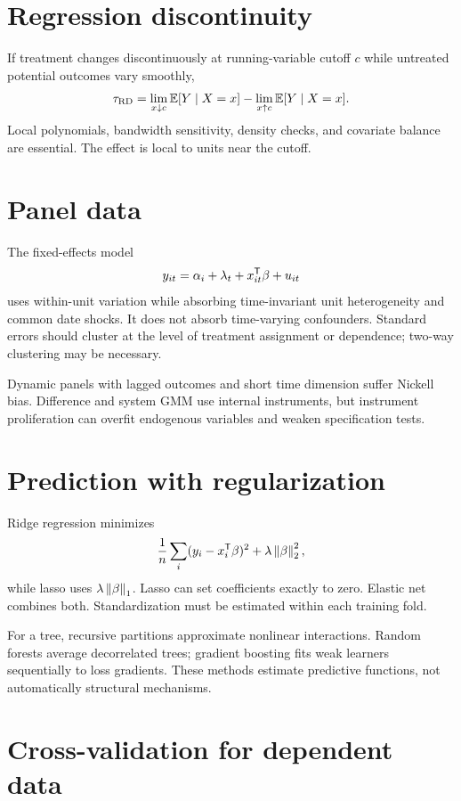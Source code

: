 \section{Regression discontinuity}

If treatment changes discontinuously at running-variable cutoff $c$ while untreated
potential outcomes vary smoothly,
\[
\tau_{\mathrm{RD}}=
\lim_{x\downarrow c}\operatorname{\mathbb E}[Y\mid X=x]
-\lim_{x\uparrow c}\operatorname{\mathbb E}[Y\mid X=x].
\]
Local polynomials, bandwidth sensitivity, density checks, and covariate balance are
essential. The effect is local to units near the cutoff.

\section{Panel data}

The fixed-effects model
\[
y_{it}=\alpha_i+\lambda_t+x_{it}^\mathsf T\beta+u_{it}
\]
uses within-unit variation while absorbing time-invariant unit heterogeneity and
common date shocks. It does not absorb time-varying confounders. Standard errors
should cluster at the level of treatment assignment or dependence; two-way
clustering may be necessary.

Dynamic panels with lagged outcomes and short time dimension suffer Nickell bias.
Difference and system GMM use internal instruments, but instrument proliferation can
overfit endogenous variables and weaken specification tests.

\section{Prediction with regularization}

Ridge regression minimizes
\[
\frac1n\sum_i(y_i-x_i^\mathsf T\beta)^2+\lambda\left\lVert\beta\right\rVert_2^2,
\]
while lasso uses $\lambda\left\lVert\beta\right\rVert_1$. Lasso can set coefficients exactly to zero.
Elastic net combines both. Standardization must be estimated within each training
fold.

For a tree, recursive partitions approximate nonlinear interactions. Random forests
average decorrelated trees; gradient boosting fits weak learners sequentially to
loss gradients. These methods estimate predictive functions, not automatically
structural mechanisms.

\section{Cross-validation for dependent data}

